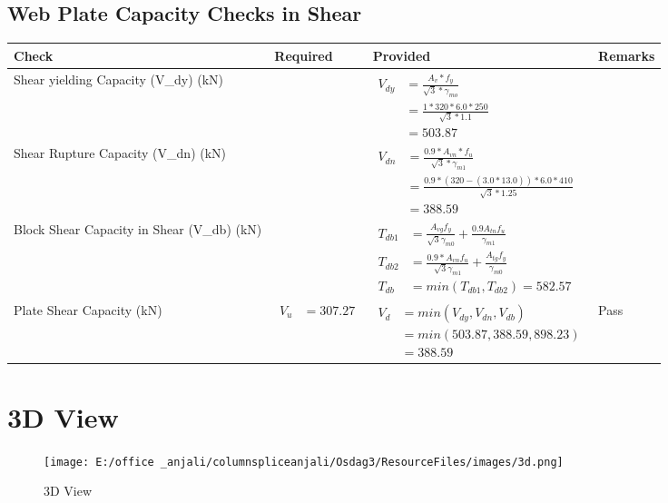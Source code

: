 \documentclass{article}%
\begin{document}
\subsection{Web Plate Capacity Checks in Shear}%
\label{subsec:WebPlateCapacityChecksinShear}%
\renewcommand{\arraystretch}{1.2}%
\begin{longtable}{|p{4cm}|p{6cm}|p{5.5cm}|p{1.5cm}|}%
\hline%
\rowcolor{OsdagGreen}%
Check&Required&Provided&Remarks\\%
\hline%
\endhead%
\hline%
Shear yielding Capacity (V\_dy) (kN)&&$\begin{aligned} V_{dy} &= \frac{A_v*f_y}{\sqrt{3}*\gamma_{mo}}\\ &=\frac{1*320*6.0*250}{\sqrt{3}*1.1}\\ &=503.87\end{aligned}$&\\%
\hline%
Shear Rupture Capacity (V\_dn) (kN)&&$\begin{aligned} V_{dn} &= \frac{0.9*A_{vn}*f_u}{\sqrt{3}*\gamma_{m1}}\\ &= \frac{0.9 *(320-(3.0*13.0))*6.0*410}{\sqrt{3}*1.25}\\ &=388.59\end{aligned}$&\\%
\hline%
Block Shear Capacity in Shear (V\_db) (kN)&&$\begin{aligned}T_{db1} &= \frac{A_{vg} f_{y}}{\sqrt{3} \gamma_{m0}} + \frac{0.9 A_{tn} f_{u}}{\gamma_{m1}}\\ T_{db2} &= \frac{0.9*A_{vn} f_{u}}{\sqrt{3} \gamma_{m1}} + \frac{A_{tg} f_{y}}{\gamma_{m0}}\\ T_{db} &= min(T_{db1}, T_{db2})= 582.57\end{aligned}$&\\%
\hline%
Plate Shear Capacity (kN)&$\begin{aligned} V_u &=307.27\end{aligned}$&$\begin{aligned} V_d &= min(V_{dy},V_{dn},V_{db})\\ &= min(503.87,388.59,898.23)\\ &=388.59\end{aligned}$&Pass\\%
\hline%
\end{longtable}

%
%
\newpage%
\section{3D View}%
\label{sec:3DView}%


\begin{figure}[h!]%
\centering%
\texttt{[image: E:/office \_anjali/columnspliceanjali/Osdag3/ResourceFiles/images/3d.png]}%
\caption{3D View}%
\end{figure}

%
\end{document}

